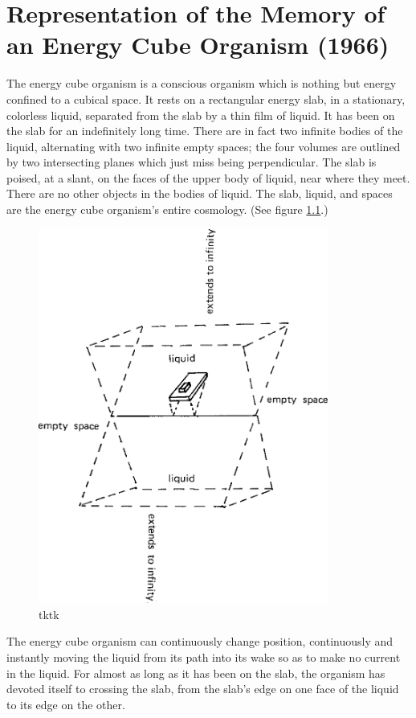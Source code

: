 \chapter{Representation of the Memory of an Energy Cube Organism (1966)}

The energy cube organism is a conscious organism which is nothing but 
energy confined to a cubical space. It rests on a rectangular energy slab, in a 
stationary, colorless liquid, separated from the slab by a thin film of liquid. 
It has been on the slab for an indefinitely long time. There are in fact two 
infinite bodies of the liquid, alternating with two infinite empty spaces; the 
four volumes are outlined by two intersecting planes which just miss being 
perpendicular. The slab is poised, at a slant, on the faces of the upper body 
of liquid, near where they meet. There are no other objects in the bodies of 
liquid. The slab, liquid, and spaces are the energy cube organism's entire 
cosmology. (See figure \ref{energycube}.)

\begin{figure}
\centering
\includegraphics[width=3.75in]{img/energycube}
\caption{tktk}
\label{energycube}
\end{figure}

The energy cube organism can continuously change position, 
continuously and instantly moving the liquid from its path into its wake so 
as to make no current in the liquid. For almost as long as it has been on the 
slab, the organism has devoted itself to crossing the slab, from the slab's edge 
on one face of the liquid to its edge on the other. 

